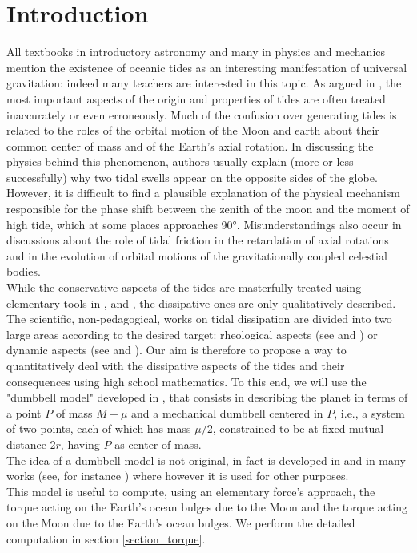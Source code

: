 \documentclass[11pt, oneside,reqno]{amsart}
\begin{document}
\section{Introduction}
All textbooks in introductory astronomy and many in physics and mechanics mention the existence of oceanic tides as an interesting manifestation of universal gravitation: indeed many teachers are interested in this topic. As argued in \cite{1}, the most important aspects of the origin and properties of tides are often treated inaccurately or even erroneously. Much of the confusion over generating tides is related to the roles of the orbital motion of the Moon and earth about their common center of mass and of the Earth's axial rotation. In discussing the physics behind this phenomenon, authors usually explain (more or less successfully) why two tidal swells appear on the opposite sides of the globe. However, it is difficult to find a plausible explanation of the physical mechanism responsible for the phase shift between the zenith of the moon and the moment of high tide, which at some places approaches 90°. Misunderstandings also occur in discussions about the role of tidal friction in the retardation of axial rotations and in the evolution of orbital motions of the gravitationally coupled celestial bodies.\\
While the conservative aspects of the tides are masterfully treated using elementary tools in \cite{1}, \cite{2} and \cite{3}, the dissipative ones are only qualitatively described. The scientific, non-pedagogical, works on tidal dissipation are divided into two large areas according to the desired target: rheological aspects (see \cite{4} and \cite{5})  or dynamic aspects (see \cite{6} and \cite{9}). Our aim is therefore to propose a way to quantitatively deal with the dissipative aspects of the tides and their consequences using high school mathematics. To this end, we will use the "dumbbell model" developed in \cite{7}, that consists in describing the planet in terms of a point $P$ of mass $M-\mu$ and a mechanical dumbbell centered in $P$, i.e., a system of two points, each of which has mass $\mu/2$, constrained to be at fixed mutual distance $2r$, having $P$ as center of mass.\\
The idea of a dumbbell model is not original, in fact is developed in \cite{9} and in many works (see, for instance \cite{8}) where however it is used for other purposes.\\
This model is useful to compute, using an elementary force's approach, the torque acting on the Earth’s ocean bulges due to the Moon and the torque acting on the Moon due to the Earth’s ocean bulges. We perform the detailed computation in section \ref{section_torque}.
\end{document}
